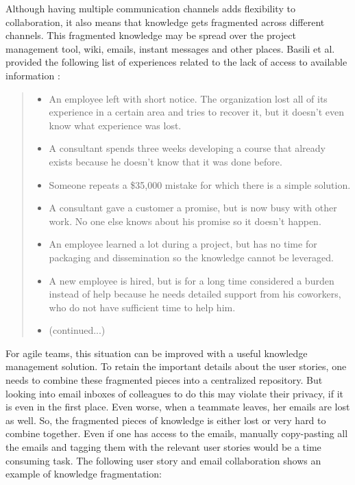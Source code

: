 Although having multiple communication channels adds flexibility to collaboration, it also means that knowledge gets fragmented across different channels. This fragmented knowledge may be spread over the project management tool, wiki, emails, instant messages and other places. Basili et al. provided the following list of experiences related to the lack of access to available information \cite{implementing_an_experience}:

\begin{quote}
\begin{itemize}
	\item An employee left with short notice. The organization lost all of its experience in a certain area and tries to recover it, but it doesn't even know what experience was lost.
	
	\item A consultant spends three weeks developing a course that already exists because he doesn't know that it was done before.
	\item Someone repeats a \$35,000 mistake for which there is a simple solution.
	\item A consultant gave a customer a promise, but is now busy with other work. No one else knows about his promise so it doesn't happen.
	\item An employee learned a lot during a project, but has no time for packaging and dissemination so the knowledge cannot be leveraged.
	\item A new employee is hired, but is for a long time considered a burden instead of help because he needs detailed support from his coworkers, who do not have sufficient time to help him.
	\item (continued...)
\end{itemize}                               
\end{quote}


For agile teams, this situation can be improved with a useful knowledge management solution. To retain the important details about the user stories, one needs to combine these fragmented pieces into a centralized repository. But looking into email inboxes of colleagues to do this may violate their privacy, if it is even in the first place. Even worse, when a teammate leaves, her emails are lost as well. So, the fragmented pieces of knowledge is either lost or very hard to combine together. Even if one has access to the emails, manually copy-pasting all the emails and tagging them with the relevant user stories would be a time consuming task. The following user story and email collaboration shows an example of knowledge fragmentation:

